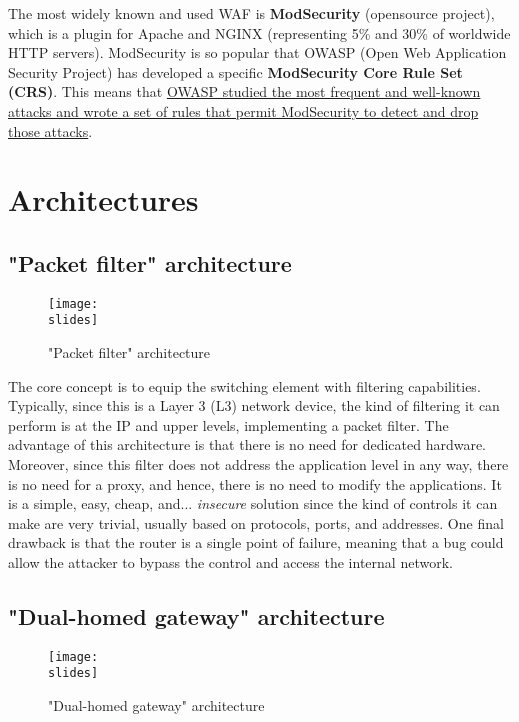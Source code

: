 The most widely known and used WAF is \textbf{ModSecurity} (opensource project), which is a plugin for Apache and NGINX (representing 5\% and 30\% of worldwide HTTP servers). ModSecurity is so popular that OWASP (Open Web Application Security Project) has developed a specific \textbf{ModSecurity Core Rule Set} \textbf{(CRS)}. This means that \ul{OWASP studied the most frequent and well-known attacks and wrote a set of rules that permit ModSecurity to detect and drop those attacks}.


\section{Architectures}

\subsection{"Packet filter" architecture}

\begin{figure}[h]
    \centering
    \texttt{[image: \\slides]}
    \caption{"Packet filter" architecture}
\end{figure}

The core concept is to equip the switching element with filtering capabilities. Typically, since this is a Layer 3 (L3) network device, the kind of filtering it can perform is at the IP and upper levels, implementing a packet filter. The advantage of this architecture is that there is no need for dedicated hardware. Moreover, since this filter does not address the application level in any way, there is no need for a proxy, and hence, there is no need to modify the applications. It is a simple, easy, cheap, and... \textit{insecure} solution since the kind of controls it can make are very trivial, usually based on protocols, ports, and addresses. One final drawback is that the router is a single point of failure, meaning that a bug could allow the attacker to bypass the control and access the internal network.

\subsection{"Dual-homed gateway" architecture}

\begin{figure}[h]
    \centering
    \texttt{[image: \\slides]}
    \caption{"Dual-homed gateway" architecture}
\end{figure}

